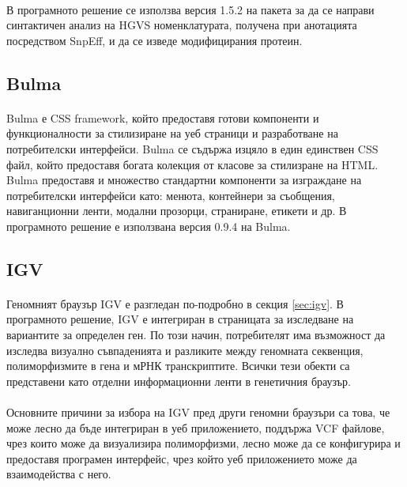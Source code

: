 \documentclass[pdftex,cyrillic,14pt,a4page,twoside,openright]{extreport}
\begin{document}
\paragraph{}
В програмното решение се използва версия 1.5.2 на пакета за да се направи синтактичен анализ на HGVS номенклатурата, получена при анотацията посредством SnpEff, и да се изведе модифицирания протеин.

\subsection{Bulma}
\paragraph{}
Bulma е CSS framework, който предоставя готови компоненти и функционалности за стилизиране на уеб страници и разработване на потребителски интерфейси. Bulma се съдържа изцяло в един единствен CSS файл, който предоставя богата колекция от класове за стилизране на HTML. Bulma предоставя и множество стандартни компоненти за изграждане на потребителски интерфейси като: менюта, контейнери за съобщения, навиганционни ленти, модални прозорци, страниране, етикети и др. В програмното решение е използвана версия 0.9.4 на Bulma.

\subsection{IGV}
\paragraph{}
Геномният браузър IGV е разгледан по-подробно в секция \ref{sec:igv}. В програмното решение, IGV е интегриран в страницата за изследване на вариантите за определен ген. По този начин, потребителят има възможност да изследва визуално съвпаденията и разликите между геномната секвенция, полиморфизмите в гена и мРНК транскриптите. Всички тези обекти са представени като отделни информационни ленти в генетичния браузър.

\paragraph{}
Основните причини за избора на IGV пред други геномни браузъри са това, че може лесно да бъде интегриран в уеб приложението, поддържа VCF файлове, чрез които може да визуализира полиморфизми, лесно може да се конфигурира и предоставя програмен интерфейс, чрез който уеб приложението може да взаимодейства с него.
\end{document}
